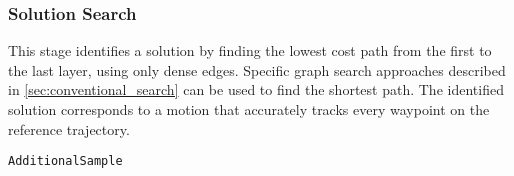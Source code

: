 \subsubsection{Solution Search} This stage identifies a solution by finding the lowest cost path from the first to the last layer, using only dense edges. Specific graph search approaches described in \cref{sec:conventional_search} can be used to find the shortest path. The identified solution corresponds to a motion that accurately tracks every waypoint on the reference trajectory. 


\setlength{\textfloatsep}{0pt}
\begin{algorithm}[tb]
    \caption{\texttt{AdditionalSample}}
    \label{alg:densification}
    

    \footnotesize 
    

\end{algorithm}
